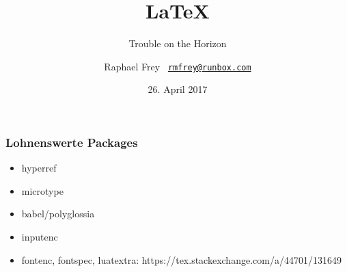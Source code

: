 \documentclass{beamer}                %
\title{\vspace*{4em}\Huge\LaTeX}
\subtitle{\hfill Trouble on the Horizon}
\date{26. April 2017}
\author{%
    Raphael Frey%
    \hfill%
    \scriptsize\texttt{%
        \href{mailto:rmfrey@runbox.com}%
        {rmfrey@runbox.com}}}
\begin{document}
                                                              

\frame[plain]{\titlepage} %

\begin{frame} %
    \frametitle{Lohnenswerte Packages}
    \begin{itemize}
        \item hyperref
        \item microtype
        \item babel/polyglossia
        \item inputenc
        \item fontenc, fontspec, luatextra: https://tex.stackexchange.com/a/44701/131649
    \end{itemize}
\end{frame}%
\end{document}
